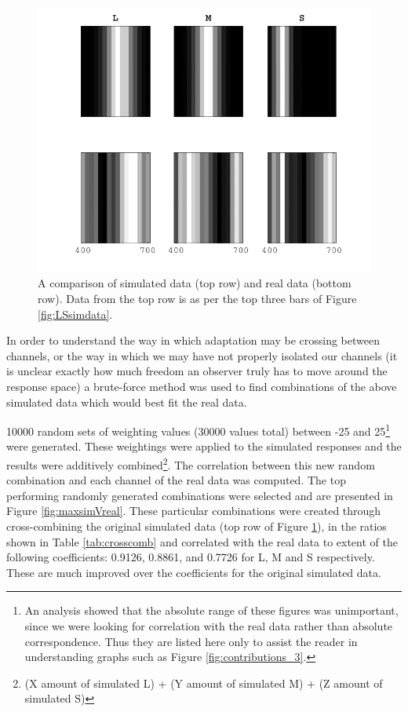 \begin{figure}[htbp]
\includegraphics[max width=\textwidth]{figs/LargeSphere/simVreal.pdf}
\caption{A comparison of simulated data (top row) and real data (bottom row). Data from the top row is as per the top three bars of Figure \ref{fig:LSsimdata}.}
\label{fig:simVreal}
\end{figure}

In order to understand the way in which adaptation may be crossing between channels, or the way in which we may have not properly isolated our channels (it is unclear exactly how much freedom an observer truly has to move around the response space) a brute-force method was used to find combinations of the above simulated data which would best fit the real data.

10000 random sets of weighting values (30000 values total) between -25 and 25\footnote{An analysis showed that the absolute range of these figures was unimportant, since we were looking for correlation with the real data rather than absolute correspondence. Thus they are listed here only to assist the reader in understanding graphs such as Figure \ref{fig:contributions_3}.} were generated. These weightings were applied to the simulated responses and the results were additively combined\footnote{(X amount of simulated L) + (Y amount of simulated M) + (Z amount of simulated S)}. The correlation between this new random combination and each channel of the real data was computed. The top performing randomly generated combinations were selected and are presented in Figure \ref{fig:maxsimVreal}. These particular combinations were created through cross-combining the original simulated data (top row of Figure \ref{fig:simVreal}), in the ratios shown in Table \ref{tab:crosscomb} and correlated with the real data to extent of the following coefficients: 0.9126, 0.8861, and 0.7726 for L, M and S respectively. These are much improved over the coefficients for the original simulated data.


